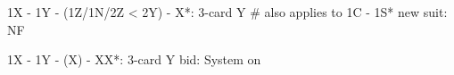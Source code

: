 1X - 1Y - (1Z/1N/2Z < 2Y) - X*: 3-card Y  # also applies to 1C - 1S*
new suit: NF

1X - 1Y - (X) - XX*: 3-card Y
bid: System on
